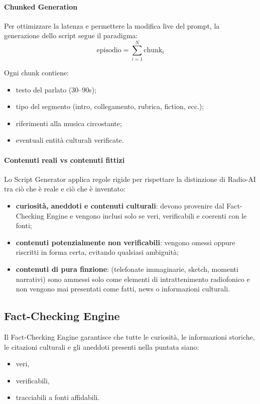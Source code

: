 \documentclass[11pt,a4paper]{article}
\begin{document}
\paragraph{Chunked Generation}

Per ottimizzare la latenza e permettere la modifica live del prompt, la generazione dello script segue il paradigma:
\[
\text{episodio} = \sum_{i=1}^{N} \text{chunk}_i
\]

Ogni chunk contiene:
\begin{itemize}
    \item testo del parlato (30–90s);
    \item tipo del segmento (intro, collegamento, rubrica, fiction, ecc.);
    \item riferimenti alla musica circostante;
    \item eventuali entità culturali verificate.
\end{itemize}

\paragraph{Contenuti reali vs contenuti fittizi}

Lo Script Generator applica regole rigide per rispettare la distinzione di Radio-AI tra ciò che è reale e ciò che è inventato:

\begin{itemize}
    \item \textbf{curiosità, aneddoti e contenuti culturali}: devono provenire dal Fact-Checking Engine e vengono inclusi solo se veri, verificabili e coerenti con le fonti;
    \item \textbf{contenuti potenzialmente non verificabili}: vengono omessi oppure riscritti in forma certa, evitando qualsiasi ambiguità;
    \item \textbf{contenuti di pura finzione}: (telefonate immaginarie, sketch, momenti narrativi) sono ammessi solo come elementi di intrattenimento radiofonico e non vengono mai presentati come fatti, news o informazioni culturali.
\end{itemize}


\subsection{Fact-Checking Engine}

Il Fact-Checking Engine garantisce che tutte le curiosità, le informazioni storiche, le citazioni culturali e gli aneddoti presenti nella puntata siano:
\begin{itemize}
    \item veri,
    \item verificabili,
    \item tracciabili a fonti affidabili.
\end{itemize}
\end{document}
